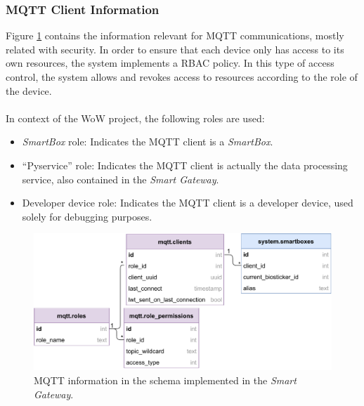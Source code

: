 \subsubsection{MQTT Client Information}

Figure \ref{fig:wow-dbschema-mqtt} contains the information relevant for \acs{MQTT} communications, mostly related with security. In order to ensure that each device only has access to its own resources, the system implements a \acf{RBAC} policy. 
In this type of access control, the system allows and revokes access to resources according to the role of the device.

\paragraph{} In context of the \acs{WoW} project, the following roles are used:

\begin{itemize}
    \item \textit{SmartBox} role: Indicates the \acs{MQTT} client is a \textit{SmartBox}.
    \item ``Pyservice'' role: Indicates the \acs{MQTT} client is actually the data processing service, also contained in the \textit{Smart Gateway}.
    \item Developer device role: Indicates the \acs{MQTT} client is a developer device, used solely for debugging purposes.
\end{itemize}

\begin{figure}[H]
    \centering
    \includegraphics[width=\linewidth]{images/database-schema-mqtt.pdf}
    \caption[\acs{MQTT} information in the schema implemented in the \textit{Smart Gateway}.]{\acs{MQTT} information in the schema implemented in the \textit{Smart Gateway}.}
    \label{fig:wow-dbschema-mqtt}
\end{figure}

